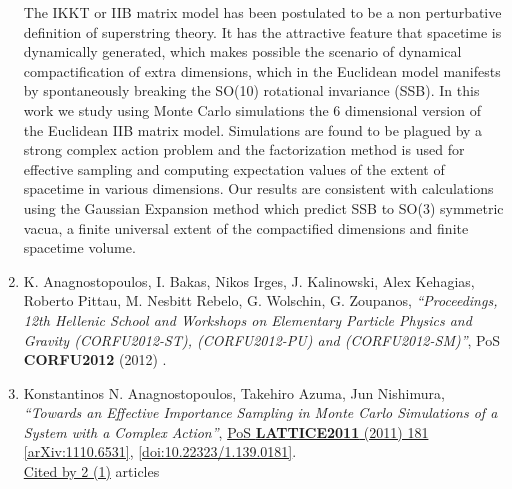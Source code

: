 \documentclass[a4paper,10pt]{article}
\begin{document}
\begin{enumerate}
The IKKT or IIB matrix model has been postulated to be a non perturbative definition of superstring theory. It has the attractive feature that spacetime is dynamically generated, which makes possible the scenario of dynamical compactification of extra dimensions, which in the Euclidean model manifests by spontaneously breaking the SO(10) rotational invariance (SSB). In this work we study using Monte Carlo simulations the 6 dimensional version of the Euclidean IIB matrix model. Simulations are found to be plagued by a strong complex action problem and the factorization method is used for effective sampling and computing expectation values of the extent of spacetime in various dimensions. Our results are consistent with calculations using the Gaussian Expansion method which predict SSB to SO(3) symmetric vacua, a finite universal extent of the compactified dimensions and finite spacetime volume.
\item K. Anagnostopoulos, I. Bakas, Nikos Irges, J. Kalinowski, Alex Kehagias, Roberto Pittau, M. Nesbitt Rebelo, G. Wolschin, G. Zoupanos, {\it ``Proceedings, 12th Hellenic School and Workshops on Elementary Particle Physics and Gravity (CORFU2012-ST), (CORFU2012-PU) and (CORFU2012-SM)''}, PoS {\bf CORFU2012} (2012) .


\item Konstantinos N. Anagnostopoulos, Takehiro Azuma, Jun Nishimura, {\it ``Towards an Effective Importance Sampling in Monte Carlo Simulations of a System with a Complex Action''}, \href{https://www.doi.org/10.22323/1.139.0181}{PoS {\bf LATTICE2011} (2011) 181} \href{https://arxiv.org/abs/1110.6531}{[arXiv:1110.6531]}, \href{https://www.doi.org/10.22323/1.139.0181}{[doi:10.22323/1.139.0181]}.
\\\href{https://inspirehep.net/literature/?q=refersto%3Arecid%3A943733}{Cited by 2 (1)} articles


\end{enumerate}
\end{document}
